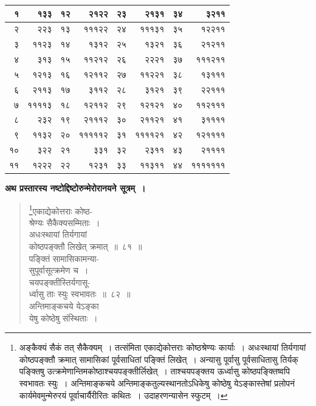 \documentclass[11pt, openany]{book}
\begin{document}
\begin{table}[h]
\centering
\small	
\begin{tabular}{|r|r|r|r|r|r|r|r|}
\hline
१ & १३३ & १२ & २१२२ & २३ & २१३१ & ३४ & ३२११ \\
\hline
२ & २२३ & १३ & १११२२ & २४ & १११३१ & ३५ & १२२११\\
\hline
३ & ११२३ & १४ & १३१२ & २५ & १३२१ & ३६ & २१२११  \\
\hline
४ & ३१३ & १५ & ११२१२ & २६ & २२२१ & ३७ & १११२११ \\
\hline
५ & १२१३ & १६ & १२११२ & २७ & ११२२१ & ३८ & १३१११  \\
\hline
६ & २११३ & १७ & ३११२ & २८ & ३१२१ & ३९ & २२१११ \\
\hline
७ & ११११३ & १८ & १२११२ & २९ & १२१२१ & ४० &  ११२१११ \\
\hline
८ & २३२ & १९ & २१११२ & ३० & २११२१ & ४१ & ३११११ \\
\hline
९ & ११३२ & २० & १११११२ & ३१ & ११११२१  & ४२ & १२११११  \\
\hline
१० & ३२२ & २१ & ३३१ & ३२ & २३११ & ४३ & २११११ \\
\hline
११ & १२२२ & २२  & १२३१ & ३३ & ११३११ & ४४ & १११११११  \\
\hline
\end{tabular}
\end{table}

\newpage

\textbf{अथ प्रस्तारस्य नष्टोद्दिष्टोरुन्मेरोरानयने सूत्रम्~।}

\begin{quote}
\renewcommand{\thefootnote}{१}\footnote{अङ्कैक्यं सैकं तत् सैकैक्यम्~। तत्संमिता एकाद्येकोत्तराः कोष्ठश्रेण्यः कार्याः~। अधःस्थायां तिर्यगायां कोष्ठपङ्क्तौ क्रमात् सामासिकां पूर्वसाधितां पङ्क्तिं लिखेत्~। अन्यासु पूर्वासु पूर्वसाधितासु तिर्यक् पङ्क्तिषु उत्क्रमेणान्तिमकोष्ठाश्चयपङ्क्तीर्लिखेत्~। ताश्चयपङ्क्तय ऊर्ध्वासु कोष्ठपङ्क्तिष्वपि स्वभावतः स्युः~। अन्तिमाङ्कचये अन्तिमाङ्कतुल्यस्थानतोऽधिकेषु कोष्ठेषु येऽङ्कास्तेषां प्रलोपनं कार्यमेवमुन्मेरुरयं पूर्वाचार्यैरीरितः कथितः~। उदाहरणन्यासेन स्फुटम्~।}{\gk एकाद्येकोत्तराः कोष्ठ-\\
श्रेण्यः सैकैक्यसम्मिताः~।\\
अधःस्थायां तिर्यगायां\\
कोष्ठपङ्क्तौ लिखेत् क्रमात्~॥~८१~॥\\
पङ्क्तिं सामासिकामन्या-\\
सुपूर्वासूत्क्रमेण च~।\\
चयपङ्क्तीस्तिर्यगासू-\\
र्ध्वासु ताः स्युः स्वभावतः~॥~८२~॥\\
अन्तिमाङ्कचये येऽङ्का\\
येषु कोष्ठेषु संस्थिताः~।}
\end{quote}
\end{document}
